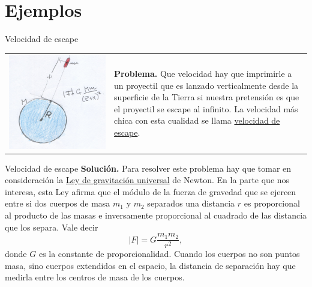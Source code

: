 \documentclass[handout,hyperref={colorlinks=true}]{beamer}
\begin{document}
\section[Ejemplos]{Ejemplos}

\begin{frame}{Velocidad de escape}\label{pag:vel_esc}

\begin{tabular}{m{4cm} m{5cm}}
 \includegraphics[scale=.075]{imagenes/tiro_vertical.jpg}&\textbf{Problema.} Que velocidad hay que imprimirle a un proyectil que es lanzado verticalmente desde la superficie de la Tierra si nuestra pretensión
es que el proyectil se escape al infinito. La velocidad más chica con esta cualidad se llama 
\href{http://es.wikipedia.org/wiki/Velocidad_de_escape}{velocidad de escape}.\\
\end{tabular}
 


\end{frame}

\begin{frame}{Velocidad de escape}
\textbf{Solución.} Para resolver este problema hay que tomar en consideración la 
\href{http://es.wikipedia.org/wiki/Ley_de_gravitación_universal}{Ley de gravitación universal} de Newton. En la parte que nos interesa, esta Ley afirma
que el módulo de la fuerza de gravedad que se ejercen entre si dos cuerpos de masa $m_1$ y $m_2$ separados una distancia $r$ es proporcional al producto de las masas  
e inversamente proporcional al cuadrado de las distancia que los separa. Vale decir
\[|F|=G\frac{m_1m_2}{r^2},\]
donde $G$ es la constante de proporcionalidad.
Cuando los cuerpos no son puntos masa, sino cuerpos extendidos en el espacio, la distancia de separación hay que medirla entre los centros de masa de los cuerpos. 
\end{frame}
\end{document}
